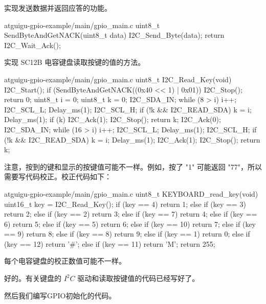 \documentclass[lang=cn,newtx,10pt,scheme=chinese]{elegantbook}
\begin{document}
实现发送数据并返回应答的功能。

\begin{mycode}{atguigu-gpio-example/main/gpio\_main.c}
uint8_t SendByteAndGetNACK(uint8_t data)
{
    I2C_Send_Byte(data);
    return I2C_Wait_Ack();
}
\end{mycode}

实现 SC12B 电容键盘读取按键的值的方法。

\begin{mycode}{atguigu-gpio-example/main/gpio\_main.c}
uint8_t I2C_Read_Key(void)
{
    I2C_Start();
    if (SendByteAndGetNACK((0x40 << 1) | 0x01))
    {
        I2C_Stop();
        return 0;
    }
    uint8_t i = 0;
    uint8_t k = 0;
    I2C_SDA_IN;
    while (8 > i)
    {
        i++;
        I2C_SCL_L;
        Delay_ms(1);
        I2C_SCL_H;
        if (!k && I2C_READ_SDA)
        {
            k = i;
        }
        Delay_ms(1);
    }
    if (k)
    {
        I2C_Ack(1);
        I2C_Stop();
        return k;
    }
    I2C_Ack(0);
    I2C_SDA_IN;
    while (16 > i)
    {
        i++;
        I2C_SCL_L;
        Delay_ms(1);
        I2C_SCL_H;
        if (!k && I2C_READ_SDA)
        {
            k = i;
        }
        Delay_ms(1);
    }
    I2C_Ack(1);
    I2C_Stop();
    return k;
}
\end{mycode}

注意，按到的键和显示的按键值可能不一样。例如，按了 "1" 可能返回 "77"，所以需要写代码校正。校正代码如下：

\begin{mycode}{atguigu-gpio-example/main/gpio\_main.c}
uint8_t KEYBOARD_read_key(void)
{
    uint16_t key = I2C_Read_Key();
    if (key == 4)
        return 1;
    else if (key == 3)
        return 2;
    else if (key == 2)
        return 3;
    else if (key == 7)
        return 4;
    else if (key == 6)
        return 5;
    else if (key == 5)
        return 6;
    else if (key == 10)
        return 7;
    else if (key == 9)
        return 8;
    else if (key == 8)
        return 9;
    else if (key == 1)
        return 0;
    else if (key == 12)
        return '#';
    else if (key == 11)
        return 'M';
    return 255;
}
\end{mycode}

\begin{marker}
每个电容键盘的校正数值可能不一样。
\end{marker}

好的。有关键盘的 $I^2C$ 驱动和读取按键值的代码已经写好了。

然后我们编写GPIO初始化的代码。
\end{document}
